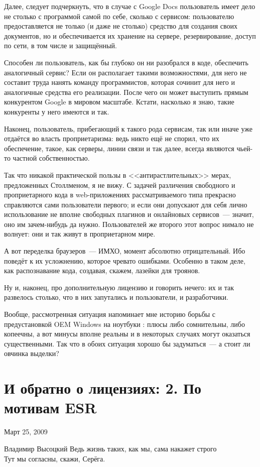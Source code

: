 Далее, следует подчеркнуть, что в случае с Google Docs пользователь имеет дело не столько с программой самой по себе, сколько с сервисом: пользователю предоставляется не только (и даже не столько) средство для создания своих документов, но и обеспечивается их хранение на сервере, резервирование, доступ по сети, в том числе и защищённый.

Способен ли пользователь, как бы глубоко он ни разобрался в коде, обеспечить аналогичный сервис? Если он располагает такими возможностями, для него не составит труда нанять команду программистов, которая сочинит для него и аналогичные средства его реализации. После чего он может выступить прямым конкурентом Google в мировом масштабе. Кстати, насколько я знаю, такие конкуренты у него имеются и так.

Наконец, пользователь, прибегающий к такого рода сервисам, так или иначе уже отдаётся во власть проприетаризма: ведь никто ещё не спорил, что их обеспечение, такое, как серверы, линии связи и так далее, всегда являются чьей-то частной собственностью.

Так что никакой практической пользы в <<антирастлительных>> мерах, предложенных Столлменом, я не вижу. С задачей различения свободного и проприетарного кода в web-приложениях рассматриваемого типа прекрасно справляются сами пользователи первого; и если они допускают для себя лично использование не вполне свободных плагинов и онлайновых сервисов~--- значит, оно им зачем-нибудь да нужно. Пользователей же второго этот вопрос нимало не волнует: они и так живут в проприетарном мире.

А вот переделка браузеров~--- ИМХО, момент абсолютно отрицательный. Ибо поведёт к их усложнению, которое чревато ошибками. Особенно в таком деле, как распознавание кода, создавая, скажем, лазейки для троянов.

Ну и, наконец, про дополнительную лицензию и говорить нечего: их и так развелось столько, что в них запутались и пользователи, и разработчики.

Вообще, рассмотренная ситуация напоминает мне историю борьбы с предустановкой OEM Windows на ноутбуки : плюсы либо сомнительны, либо копеечны, а вот минусы вполне реальны и в некоторых случаях могут оказаться существенными. Так что в обоих ситуация хорошо бы задуматься~--- а стоит ли овчинка выделки?

\section{И обратно о лицензиях: 2. По мотивам ESR}
\begin{timeline}Март 25, 2009\end{timeline}
\begin{shadequote}[r]{Владимир Высоцкий}
Ведь жизнь таких, как мы, сама накажет строго \\
Тут мы согласны, скажи, Серёга. 
\end{shadequote}


